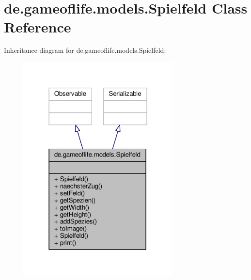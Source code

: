 \hypertarget{classde_1_1gameoflife_1_1models_1_1Spielfeld}{\section{de.\-gameoflife.\-models.\-Spielfeld Class Reference}
\label{classde_1_1gameoflife_1_1models_1_1Spielfeld}
}


Inheritance diagram for de.\-gameoflife.\-models.\-Spielfeld\-:\nopagebreak
\begin{figure}[H]
\begin{center}
\leavevmode
\includegraphics[width=231pt]{classde_1_1gameoflife_1_1models_1_1Spielfeld__inherit__graph}
\end{center}
\end{figure}


